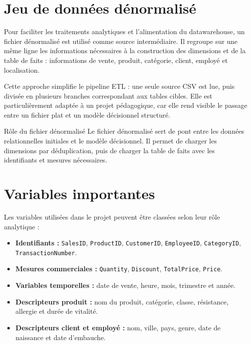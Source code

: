 \documentclass[12pt,a4paper,twoside]{report}
\begin{document}
\section{Jeu de données dénormalisé}

Pour faciliter les traitements analytiques et l'alimentation du datawarehouse, un fichier dénormalisé est utilisé comme source intermédiaire. Il regroupe sur une même ligne les informations nécessaires à la construction des dimensions et de la table de faits : informations de vente, produit, catégorie, client, employé et localisation.

Cette approche simplifie le pipeline ETL : une seule source CSV est lue, puis divisée en plusieurs branches correspondant aux tables cibles. Elle est particulièrement adaptée à un projet pédagogique, car elle rend visible le passage entre un fichier plat et un modèle décisionnel structuré.

\begin{resultbox}{Rôle du fichier dénormalisé}
Le fichier dénormalisé sert de pont entre les données relationnelles initiales et le modèle décisionnel. Il permet de charger les dimensions par déduplication, puis de charger la table de faits avec les identifiants et mesures nécessaires.
\end{resultbox}

\section{Variables importantes}

Les variables utilisées dans le projet peuvent être classées selon leur rôle analytique :

\begin{itemize}
  \item \textbf{Identifiants :} \texttt{SalesID}, \texttt{ProductID}, \texttt{CustomerID}, \texttt{EmployeeID}, \texttt{CategoryID}, \texttt{TransactionNumber}.
  \item \textbf{Mesures commerciales :} \texttt{Quantity}, \texttt{Discount}, \texttt{TotalPrice}, \texttt{Price}.
  \item \textbf{Variables temporelles :} date de vente, heure, mois, trimestre et année.
  \item \textbf{Descripteurs produit :} nom du produit, catégorie, classe, résistance, allergie et durée de vitalité.
  \item \textbf{Descripteurs client et employé :} nom, ville, pays, genre, date de naissance et date d'embauche.
\end{itemize}
\end{document}

